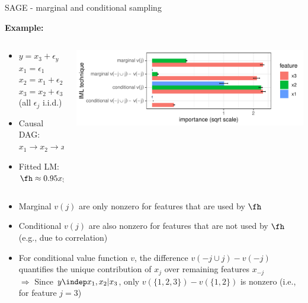 \documentclass[11pt,compress,t,notes=noshow, aspectratio=169, xcolor=table]{beamer}
\begin{document}
\begin{frame}{SAGE - marginal and conditional sampling}

\textbf{Example:}
%
\begin{columns}[T, totalwidth=\textwidth]
\begin{column}{0.4\textwidth}
\begin{itemize}
    \item $y = x_3 + \epsilon_y$\\ $x_1 = \epsilon_1$\\ $x_2 = x_1 + \epsilon_2$\\ $x_3 = x_2 + \epsilon_3$ (all $\epsilon_j$ i.i.d.)
    \item Causal DAG: $x_1 \rightarrow x_2 \rightarrow x_3 \rightarrow y$
    \item Fitted LM: $\fh \approx 0.95 x_3 + 0.05 x_2$
\end{itemize}
\end{column}
\pause
\begin{column}{0.6\textwidth}
\centerline{\includegraphics[width=\linewidth]{figure_man/sage_variants}}
\end{column}
\end{columns}
\lz
\begin{itemize}
    \item Marginal $v(j)$ are only nonzero for features that are used by $\fh$
    \item Conditional $v(j)$ are also nonzero for features that are not used by $\fh$ (e.g., due to correlation)
    \item For conditional value function $v$, the difference $v(-j \cup j) - v(-j)$ quantifies the unique contribution of $x_j$ over remaining features $x_{-j}$\\
    $\Rightarrow$ Since $y \indep x_1, x_2 | x_3$, only $v(\{1,2,3\}) - v(\{1, 2\})$ is nonzero (i.e., for feature $j = 3$)
\end{itemize}

\end{frame}
\end{document}
